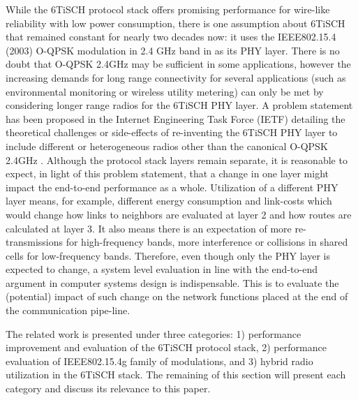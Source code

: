 \documentclass[journal]{IEEEtran}
\newcommand{\oqpsk}        {O-QPSK 2.4GHz }
\begin{document}
While the 6TiSCH protocol stack offers promising performance for wire-like reliability with low power consumption, there is one assumption about 6TiSCH that remained constant for nearly two decades now: it uses the IEEE802.15.4 (2003) O-QPSK modulation in 2.4 GHz band in as its PHY layer. 
There is no doubt that \oqpsk may be sufficient in some applications, however the increasing demands for long range connectivity for several applications (such as environmental monitoring or wireless utility metering) can only be met by considering longer range radios for the 6TiSCH PHY layer.
A problem statement has been proposed in the Internet Engineering Task Force (IETF) detailing the theoretical challenges or side-effects of re-inventing the 6TiSCH PHY layer to include different or heterogeneous radios other than the canonical \oqpsk \cite{j.munoz18problem}. 
Although the protocol stack layers remain separate, it is reasonable to expect, in light of this problem statement, that a change in one layer might impact the end-to-end performance as a whole. 
Utilization of a different PHY layer means, for example, different energy consumption and link-costs which would change how links to neighbors are evaluated at layer 2 and how routes are calculated at layer 3.
It also means there is an expectation of more re-transmissions for high-frequency bands, more interference or collisions in shared cells for low-frequency bands.
Therefore, even though only the PHY layer is expected to change, a system level evaluation in line with the end-to-end argument in computer systems design \cite{saltzer84endtoend} is indispensable.
This is to evaluate the (potential) impact of such change on the network functions placed at the end of the communication pipe-line. 

The related work is presented under three categories: 
    1) performance improvement and evaluation of the 6TiSCH protocol stack,
    2) performance evaluation of IEEE802.15.4g family of modulations, and
    3) hybrid radio utilization in the 6TiSCH stack. 
The remaining of this section will present each category and discuss its relevance to this paper.
\end{document}
